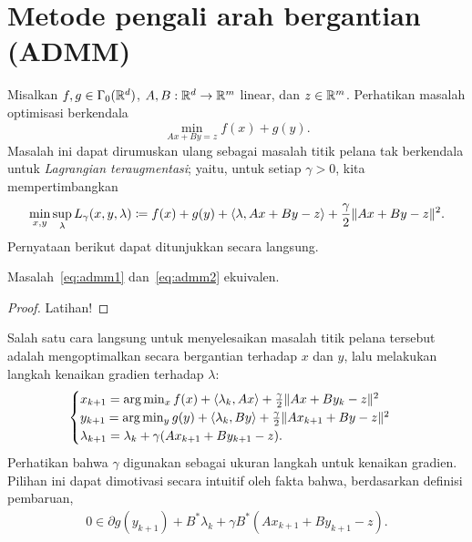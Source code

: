 \section{Metode pengali arah bergantian (ADMM)}
Misalkan $f,g\in\Gamma_0(\mathbb{R}^d)$, $A,B:\mathbb{R}^d\rightarrow\mathbb{R}^m$ linear, dan $z\in\mathbb{R}^m$. Perhatikan masalah optimisasi berkendala
\begin{equation}\label{eq:admm1}
    \min_{Ax + By = z} f(x) + g(y).
\end{equation}
Masalah ini dapat dirumuskan ulang sebagai masalah titik pelana tak berkendala untuk \emph{Lagrangian teraugmentasi}; yaitu, untuk setiap $\gamma>0$, kita mempertimbangkan
\begin{equation}\label{eq:admm2}
    \min_{x,y}\sup_{\lambda} L_\gamma (x,y,\lambda) \coloneqq f(x) + g(y) + \left\langle\lambda , Ax + By - z\right\rangle + \frac{\gamma}{2}\|Ax + By - z\|^2.
\end{equation}
Pernyataan berikut dapat ditunjukkan secara langsung.
\begin{lemma}
    Masalah~\eqref{eq:admm1} dan~\eqref{eq:admm2} ekuivalen.
\end{lemma}
\begin{proof}
    Latihan!
\end{proof}
Salah satu cara langsung untuk menyelesaikan masalah titik pelana tersebut adalah mengoptimalkan secara bergantian terhadap $x$ dan $y$, lalu melakukan langkah kenaikan gradien terhadap $\lambda$:
\begin{equation}\label{duality:eq:admm_algo}
    \begin{cases}
        x_{k+1} = \arg\min_{x} f(x) + \left\langle\lambda_k , Ax\right\rangle + \frac{\gamma}{2}\|Ax + By_k - z\|^2\\
        y_{k+1} = \arg\min_{y} g(y) + \left\langle\lambda_k , By\right\rangle + \frac{\gamma}{2}\|Ax_{k+1} + By - z\|^2\\
        \lambda_{k+1} = \lambda_k + \gamma (Ax_{k+1} + By_{k+1} - z).
    \end{cases}
\end{equation}
Perhatikan bahwa $\gamma$ digunakan sebagai ukuran langkah untuk kenaikan gradien. Pilihan ini dapat dimotivasi secara intuitif oleh fakta bahwa, berdasarkan definisi pembaruan,
\begin{equation}\label{duality:eq:admm3}
    \begin{aligned}
        0 \in \partial g(y_{k+1}) + B^* \lambda_k + \gamma B^*(Ax_{k+1} + By_{k+1}-z).
    \end{aligned}
\end{equation}
